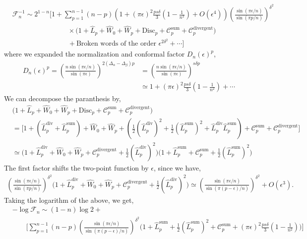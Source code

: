 \documentclass[11pt]{article}
\newcommand{\ep}{\epsilon}
\newcommand{\nn}{\nonumber}
\newcommand{\lb}{\left(}
\newcommand{\rb}{\right)}
\begin{document}
\begin{align}
       & \mathcal{F}_n^{-1} \sim 2^{1-n} \Bigg[1 + \sum_{p=1}^{n-1}(n-p)\lb  1+  (\pi \ep)^2\frac{ps\delta}{3}\lb1 - \frac{1}{n^2}\rb  + O(\ep^4)\rb \lb\frac{\sin(\pi \ep/n)}{\sin (\pi p/n)}\rb^{\delta^2} \nn \\ &\qquad \qquad \qquad \qquad  \times \Big( 1 + \hat{L}_p + \hat{W}_0 + \hat{W}_p + \text{Disc}_p + \mathcal{C}_p^{\text{sum}} + \mathcal{C}_p^{\text{divergent}}\Big) \nn\\&\qquad\qquad \qquad \qquad 
        + \text{Broken words of the order }\ep^{2\delta^2} + \cdots \Bigg] 
    \end{align}
where we expanded the normalization and conformal factor $D_n(\ep)^p$,
\begin{align}
    D_n(\ep)^p = \lb\frac{n\sin(\pi \ep/n)}{\sin(\pi \ep)}\rb^{2(\Delta_\alpha - \Delta_\beta)p} &= \lb\frac{n\sin(\pi \ep/n)}{\sin(\pi \ep)}\rb^{s\delta p} \\
    &\simeq 1+  (\pi \ep)^2\frac{ps\delta}{3}\lb1 - \frac{1}{n^2}\rb + \cdots
\end{align}
We can decompose the paranthesis by,
\begin{align}
    &\Big( 1 + \hat{L}_p + \hat{W}_0 + \hat{W}_p + \text{Disc}_p + \mathcal{C}_p^{\text{sum}} + \mathcal{C}_p^{\text{divergent}} \Big) \\
    &= \Bigg[ 1 + \lb \hat{L}_p^{\text{div}} + \hat{L}_p^{\text{sum}} \rb + \hat{W}_0 + \hat{W}_p + \lb  \frac{1}{2}\lb\hat{L}_p^{\text{div}}\rb^2+   \frac{1}{2}\lb\hat{L}_p^{\text{sum}}\rb^2 + \hat{L}_p^{\text{div}}\hat{L}_p^{\text{sum}}\rb  + \mathcal{C}_p^{\text{sum}} + \mathcal{C}_p^{\text{divergent}} \Bigg]
    \\
    & \simeq \Bigg(1 + \hat{L}_p^{\text{div}} + \hat{W}_0 + \hat{W}_p +\mathcal{C}_p^{\text{divergent}} +  \frac{1}{2}\lb\hat{L}_p^{\text{div}}\rb^2\Bigg) \Bigg( 1+ \hat{L}_p^{\text{sum}} + \mathcal{C}_p^{\text{sum} } + \frac{1}{2}\lb \hat{L}_p^{\text{sum}}\rb^2\Bigg)
\end{align}
The first factor shifts the two-point function by $\ep$, since we have,
\begin{align}
    \lb\frac{\sin(\pi \ep/n)}{\sin (\pi p/n)}\rb^{\delta^2} \Bigg(1 + \hat{L}_p^{\text{div}} + \hat{W}_0 + \hat{W}_p +\mathcal{C}_p^{\text{divergent}} + \frac{1}{2}\lb \hat{L}_p^{\text{div}}\rb^2\Bigg) \simeq  \lb\frac{\sin(\pi \ep/n)}{\sin (\pi (p-\ep)/n)}\rb^{\delta^2} + O(\ep^3).
\end{align}
Taking the logarithm of the above, we get,
\begin{align}
        &-\log \mathcal{F}_n\sim (1-n)\log 2 + \nn\\ &\qquad \Bigg[ \sum_{p=1}^{n-1}(n-p) \lb\frac{\sin(\pi \ep/n)}{\sin (\pi (p-\ep)/n)}\rb^{\delta^2} \Big( 1 + \hat{L}_p^{\text{sum}}   + \frac{1}{2}\lb \hat{L}_p^{\text{sum}}\rb ^2 + \mathcal{C}_p^{\text{sum}} + (\pi \ep)^2\frac{ps\delta}{3}\lb1 - \frac{1}{n^2}\rb\Big)   \Bigg]
\end{align}
\end{document}
